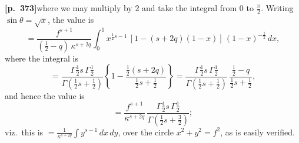 \documentclass[11pt]{article}
\begin{document}
\bigskip

\noindent\textbf{[p.~373]}\quad where we may multiply by $2$ and take the integral from $0$ to $\tfrac{\pi}{2}$. Writing $\sin\theta=\sqrt{x}$, the value is
\[
= \frac{f^{s+1}}{(\tfrac{1}{2}-q)\,\kappa^{s+2q}}\int_{0}^{1} x^{\frac{1}{2}s-1}\,[1-(s+2q)(1-x)]\,(1-x)^{-\frac{1}{2}}\,dx,
\]
where the integral is
\[
= \frac{\Gamma\tfrac{1}{2}s\,\Gamma\tfrac{1}{2}}{\Gamma(\tfrac{1}{2}s+\tfrac{1}{2})}\!\left\{1 - \frac{\tfrac{1}{2}(s+2q)}{\tfrac{1}{2}s+\tfrac{1}{2}}\right\}
= \frac{\Gamma\tfrac{1}{2}s\,\Gamma\tfrac{1}{2}}{\Gamma(\tfrac{1}{2}s+\tfrac{1}{2})}\,\frac{\tfrac{1}{2}-q}{\tfrac{1}{2}s+\tfrac{1}{2}},
\]
and hence the value is
\[
= \frac{f^{s+1}}{\kappa^{s+2q}}\,\frac{\Gamma\tfrac{1}{2}s\,\Gamma\tfrac{1}{2}}{\Gamma(\tfrac{1}{2}s+\tfrac{3}{2})};
\]
viz.\ this is $\displaystyle =\frac{1}{\kappa^{s+2q}}\int y^{s-1}\,dx\,dy$, over the circle $x^{2}+y^{2}=f^{2}$, as is easily verified.

\bigskip
\end{document}
